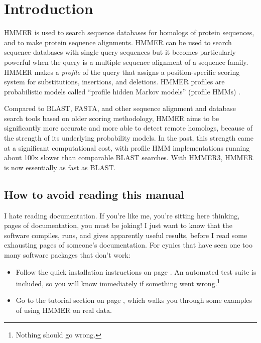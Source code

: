 \section{Introduction}
\setcounter{footnote}{0}

HMMER is used to search sequence databases for homologs of protein
sequences, and to make protein sequence alignments. HMMER can be used
to search sequence databases with single query sequences but it
becomes particularly powerful when the query is a multiple sequence
alignment of a sequence family. HMMER makes a \emph{profile} of the
query that assigns a position-specific scoring system for
substitutions, insertions, and deletions. HMMER profiles are
probabilistic models called ``profile hidden Markov models'' (profile
HMMs) \citep{Krogh94,Eddy98,Durbin98}.

Compared to BLAST, FASTA, and other sequence alignment and database
search tools based on older scoring methodology, HMMER aims to be
significantly more accurate and more able to detect remote homologs,
because of the strength of its underlying probability models. In the
past, this strength came at a significant computational cost, with
profile HMM implementations running about 100x slower than comparable
BLAST searches. With HMMER3, HMMER is now essentially as fast as
BLAST.


\subsection{How to avoid reading this manual}

I hate reading documentation. If you're like me, you're sitting here
thinking, \pageref{manualend} pages of documentation, you must be
joking! I just want to know that the software compiles, runs, and
gives apparently useful results, before I read some 
\pageref{manualend} exhausting pages of someone's documentation. For
cynics that have seen one too many software packages that don't
work:

\begin{itemize}
\item Follow the quick installation instructions on page
      \pageref{section:installation}. An automated test suite
      is included, so you will know immediately if something
      went wrong.\footnote{Nothing should go wrong.}
\item Go to the tutorial section on page
\pageref{section:tutorial}, which walks you through some examples of
using HMMER on real data.
\end{itemize}

